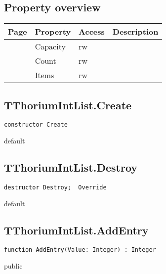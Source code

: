 \subsection{Property overview}
\label{thoriumcore:thorium:tthoriumintlist:properties}
\begin{tabularx}{\textwidth}{lllX}
Page & Property & Access & Description \\ \hline
\pageref{thoriumcore:thorium:tthoriumintlist:capacity} & Capacity & rw &  \\
\pageref{thoriumcore:thorium:tthoriumintlist:count} & Count & rw &  \\
\pageref{thoriumcore:thorium:tthoriumintlist:items} & Items & rw &  \\
\hline
\end{tabularx}
\subsection{TThoriumIntList.Create}
\label{thoriumcore:thorium:tthoriumintlist:create}
\begin{FPCList}
\Synopsis
\Declaration 

\begin{verbatim}
constructor Create
\end{verbatim}
\Visibility
default
\Description
\Errors
\end{FPCList}
\subsection{TThoriumIntList.Destroy}
\label{thoriumcore:thorium:tthoriumintlist:destroy}
\begin{FPCList}
\Synopsis
\Declaration 

\begin{verbatim}
destructor Destroy;  Override
\end{verbatim}
\Visibility
default
\Description
\Errors
\end{FPCList}
\subsection{TThoriumIntList.AddEntry}
\label{thoriumcore:thorium:tthoriumintlist:addentry}
\begin{FPCList}
\Synopsis
\Declaration 

\begin{verbatim}
function AddEntry(Value: Integer) : Integer
\end{verbatim}
\Visibility
public
\Description
\Errors
\end{FPCList}
